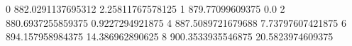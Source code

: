 0 882.0291137695312 2.25811767578125
1 879.77099609375 0.0
2 880.6937255859375 0.9227294921875
4 887.5089721679688 7.73797607421875
6 894.157958984375 14.386962890625
8 900.3533935546875 20.5823974609375
